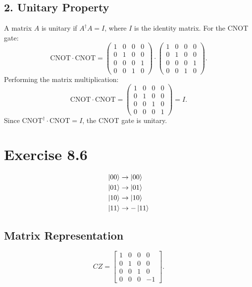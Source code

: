 \documentclass{article}
\begin{document}
\subsection*{2. Unitary Property}

A matrix \(A\) is unitary if \(A^\dagger A = I\), where \(I\) is the identity matrix. For the CNOT gate:
\[
\text{CNOT} \cdot \text{CNOT} = \begin{pmatrix}
1 & 0 & 0 & 0 \\
0 & 1 & 0 & 0 \\
0 & 0 & 0 & 1 \\
0 & 0 & 1 & 0
\end{pmatrix}
\cdot
\begin{pmatrix}
1 & 0 & 0 & 0 \\
0 & 1 & 0 & 0 \\
0 & 0 & 0 & 1 \\
0 & 0 & 1 & 0
\end{pmatrix}.
\]
Performing the matrix multiplication:
\[
\text{CNOT} \cdot \text{CNOT} = \begin{pmatrix}
1 & 0 & 0 & 0 \\
0 & 1 & 0 & 0 \\
0 & 0 & 1 & 0 \\
0 & 0 & 0 & 1
\end{pmatrix} = I.
\]
Since \(\text{CNOT}^\dagger \cdot \text{CNOT} = I\), the CNOT gate is unitary.

\section*{Exercise 8.6}
\begin{align*}
    \ket{00} &\rightarrow \ket{00} \\
    \ket{01} &\rightarrow \ket{01} \\
    \ket{10} &\rightarrow \ket{10} \\
    \ket{11} &\rightarrow -\ket{11} 
\end{align*}

\subsection*{Matrix Representation}
\[
CZ =
\begin{bmatrix}
1 & 0 & 0 & 0 \\
0 & 1 & 0 & 0 \\
0 & 0 & 1 & 0 \\
0 & 0 & 0 & -1
\end{bmatrix}.
\]
\end{document}
